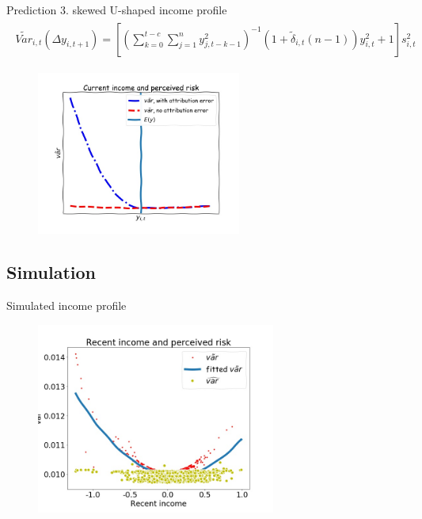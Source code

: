 \documentclass{beamer}
\begin{document}
\begin{frame}{Prediction 3. skewed U-shaped income profile}
	\begin{eqnarray}
		\begin{split}
			\tilde {Var}_{i,t}(\Delta y_{i,t+1})  = [(\sum^{t-c}_{k=0}\sum^{n}_{j=1}y^2_{j,t-k-1})^{-1}(1+\tilde\delta_{i,t}(n-1))y^2_{i,t} + 1] s^2_{i,t} 
		\end{split}
	\end{eqnarray}
		\begin{figure}
		\centering 
		\label{var_experience_var}
		\includegraphics[width=0.6\textwidth, height = 0.6\textheight]{figures/var_recent.jpg}
	\end{figure}
\end{frame}



\subsection{Simulation}	


\begin{frame}{Simulated income profile}
	\begin{figure}
		\centering 
		\label{var_experience_var}
		\includegraphics[width=0.7\textwidth]{figures/var_recent_sim.jpg}
	\end{figure}
\end{frame}
\end{document}
